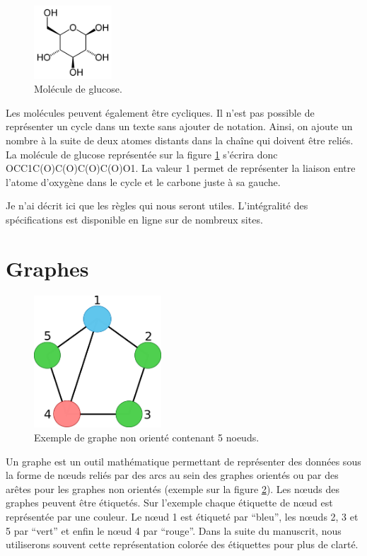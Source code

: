 \begin{figure}[h!]
  \begin{center}
    \includegraphics[width=110px]{Figures/Prerequis/glucose.png}
    \caption{\label{glucose}Molécule de glucose.}
  \end{center}
\end{figure}

Les molécules peuvent également être cycliques.
Il n'est pas possible de représenter un cycle dans un texte sans ajouter de notation.
Ainsi, on ajoute un nombre à la suite de deux atomes distants dans la chaîne qui doivent être reliés.
La molécule de glucose représentée sur la figure \ref{glucose} s'écrira donc OCC1C(O)C(O)C(O)C(O)O1.
La valeur 1 permet de représenter la liaison entre l'atome d'oxygène dans le cycle et le carbone juste à sa gauche.

Je n'ai décrit ici que les règles qui nous seront utiles.
L'intégralité des spécifications est disponible en ligne sur de nombreux sites.



\section{Graphes}
\label{graphes}

\begin{figure}[h!]
  \begin{center}
    \includegraphics[width=180px]{Figures/Prerequis/graphe.png}
    \caption{\label{graphe_def}Exemple de graphe non orienté contenant 5 noeuds.}
  \end{center}
\end{figure}

Un graphe est un outil mathématique permettant de représenter des données sous la forme de n\oe{}uds reliés par des arcs au sein des graphes orientés ou par des arêtes pour les graphes non orientés (exemple sur la figure \ref{graphe_def}).
Les n\oe{}uds des graphes peuvent être étiquetés.
Sur l'exemple chaque étiquette de n\oe{}ud est représentée par une couleur.
Le n\oe{}ud 1 est étiqueté par ``bleu'', les n\oe{}uds 2, 3 et 5 par ``vert'' et enfin le n\oe{}ud 4 par ``rouge''.
Dans la suite du manuscrit, nous utiliserons souvent cette représentation colorée des étiquettes pour plus de clarté.

